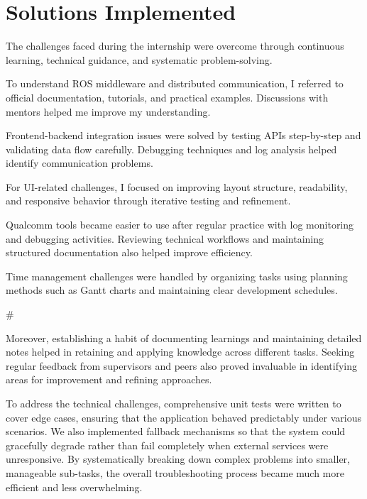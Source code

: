 \documentclass[12pt,a4paper]{report}
\begin{document}
\section{Solutions Implemented}

The challenges faced during the internship were overcome through continuous learning, technical guidance, and systematic problem-solving.


To understand ROS middleware and distributed communication, I referred to official documentation, tutorials, and practical examples. Discussions with mentors helped me improve my understanding.


Frontend-backend integration issues were solved by testing APIs step-by-step and validating data flow carefully. Debugging techniques and log analysis helped identify communication problems.


For UI-related challenges, I focused on improving layout structure, readability, and responsive behavior through iterative testing and refinement.


Qualcomm tools became easier to use after regular practice with log monitoring and debugging activities. Reviewing technical workflows and maintaining structured documentation also helped improve efficiency.


Time management challenges were handled by organizing tasks using planning methods such as Gantt charts and maintaining clear development schedules.


\#


Moreover, establishing a habit of documenting learnings and maintaining detailed notes helped in retaining and applying knowledge across different tasks. Seeking regular feedback from supervisors and peers also proved invaluable in identifying areas for improvement and refining approaches.


To address the technical challenges, comprehensive unit tests were written to cover edge cases, ensuring that the application behaved predictably under various scenarios. We also implemented fallback mechanisms so that the system could gracefully degrade rather than fail completely when external services were unresponsive. By systematically breaking down complex problems into smaller, manageable sub-tasks, the overall troubleshooting process became much more efficient and less overwhelming.


\end{document}
